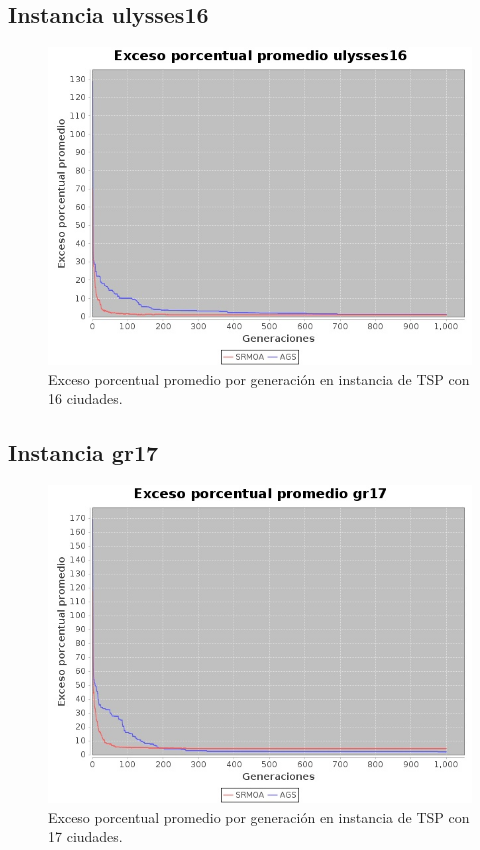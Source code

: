 \documentclass[12pt]{article}
\begin{document}
\subsection{Instancia ulysses16}
\begin{figure}[H]
  \centering
  \includegraphics[width=1\textwidth]{graficas/ulysses16}
  \caption{Exceso porcentual promedio por generación en instancia de TSP con 16 ciudades.}
\end{figure}
\subsection{Instancia gr17}
\begin{figure}[H]
  \centering
  \includegraphics[width=1\textwidth]{graficas/gr17}
  \caption{Exceso porcentual promedio por generación en instancia de TSP con 17 ciudades.}
\end{figure}
\end{document}
